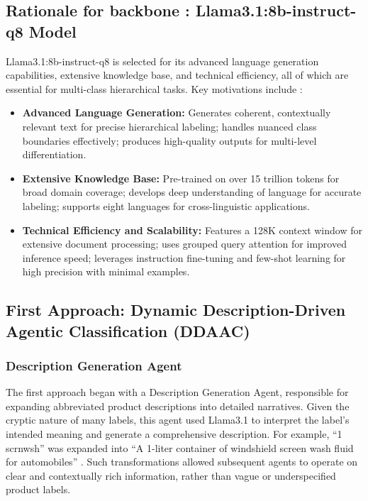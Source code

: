 \documentclass[9pt,a4paper,twoside]{rho-class/rho}
\begin{document}
    \subsection{Rationale for backbone : Llama3.1:8b-instruct-q8 Model}

Llama3.1:8b-instruct-q8 is selected for its advanced language generation capabilities, extensive knowledge base, and technical efficiency, all of which are essential for multi-class hierarchical tasks. Key motivations include \cite{dubey2024llama}:

\begin{itemize}
    \item \textbf{Advanced Language Generation:} Generates coherent, contextually relevant text for precise hierarchical labeling; handles nuanced class boundaries effectively; produces high-quality outputs for multi-level differentiation.
    
    \item \textbf{Extensive Knowledge Base:} Pre-trained on over 15 trillion tokens for broad domain coverage; develops deep understanding of language for accurate labeling; supports eight languages for cross-linguistic applications.

    \item \textbf{Technical Efficiency and Scalability:} Features a 128K context window for extensive document processing; uses grouped query attention for improved inference speed; leverages instruction fine-tuning and few-shot learning for high precision with minimal examples.
\end{itemize}

\subsection{First Approach: Dynamic Description-Driven Agentic Classification (DDAAC)}

\subsubsection{Description Generation Agent}
The first approach began with a Description Generation Agent, responsible for expanding abbreviated product descriptions into detailed narratives. Given the cryptic nature of many labels, this agent used Llama3.1 to interpret the label's intended meaning and generate a comprehensive description. For example, “1 scrnwsh” was expanded into “A 1-liter container of windshield screen wash fluid for automobiles” \cite{chai2020description}. Such transformations allowed subsequent agents to operate on clear and contextually rich information, rather than vague or underspecified product labels.
\end{document}
